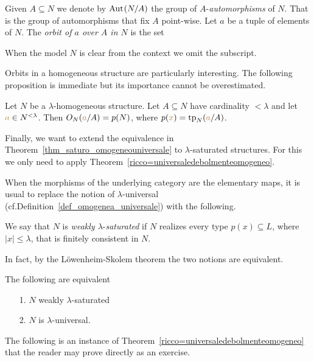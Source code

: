 Given $A\subseteq N$ we denote by \emph{${\rm Aut\kern.15ex}(N/A)$\/} the group of \emph{$A\mbox{-}$automorphisms\/} of $N$. That is the group of automorphisms that fix $A$ point-wise.
Let $a$ be a tuple of elements of $N$. The \emph{orbit of $a$ over $A$ in $N$} is the set


When the model $N$ is clear from the context we omit the subscript.

Orbits in a homogeneous structure are particularly interesting. The following proposition is immediate but its importance cannot be overestimated.

\begin{proposition}\label{omogeneitaorbitetipi}
Let $N$ be a $\lambda\mbox{-}$homogeneous structure. Let $A\subseteq N$ have cardinality $<\lambda$ and let ${\color{brown} a}\in N^{<\lambda}$. Then $O_N({\color{brown} a}/A)=p(N)$, where $p({\color{brown} x})={\rm tp}_N({\color{brown} a}/A)$.
\end{proposition}


Finally, we want to extend the equivalence in Theorem~\ref{thm_saturo_omogeneouniversale} to $\lambda\mbox{-}$saturated structures. For this we only need to apply Theorem~\ref{ricco=universaledebolmenteomogeneo}. 

When the morphisms of the underlying category are the elementary maps, it is usual to replace the notion of $\lambda\mbox{-}$universal (cf.\@ Definition~\ref{def_omogenea_universale}) with the following.

\begin{definition}\label{def_w_saturation}
  We say that $N$ is \emph{weakly $\lambda\mbox{-}$saturated\/} if $N$ realizes every type $p(x)\subseteq L$, where $|x|\le\lambda$, that is finitely consistent in $N$.
\end{definition}

In fact, by the L\"owenheim-Skolem theorem the two notions are equivalent.

\begin{proposition}\label{prop_w_saturation}
The following are equivalent
\begin{itemize}
\item[1.] $N$ weakly $\lambda\mbox{-}$saturated
\item[2.] $N$ is $\lambda$-universal.
\end{itemize}
\end{proposition}

The following is an instance of Theorem~\ref{ricco=universaledebolmenteomogeneo} that the reader may prove directly as an exercise.

